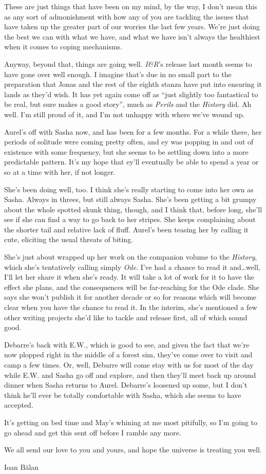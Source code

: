 These are just things that have been on my mind, by the way, I don't mean this as any sort of admonishment with how any of you are tackling the issues that have taken up the greater part of our worries the last few years. We're just doing the best we can with what we have, and what we have isn't always the healthiest when it comes to coping mechanisms.

Anyway, beyond that, things are going well. \emph{I\&R}'s release last month seems to have gone over well enough. I imagine that's due in no small part to the preparation that Jonas and the rest of the eighth stanza have put into ensuring it lands as they'd wish. It has yet again come off as ``just slightly too fantastical to be real, but sure makes a good story'', much as \emph{Perils} and the \emph{History} did. Ah well. I'm still proud of it, and I'm not unhappy with where we've wound up.

Aurel's off with Sasha now, and has been for a few months. For a while there, her periods of solitude were coming pretty often, and ey was popping in and out of existence with some frequency, but she seems to be settling down into a more predictable pattern. It's my hope that ey'll eventually be able to spend a year or so at a time with her, if not longer.

She's been doing well, too. I think she's really starting to come into her own as Sasha. Always in threes, but still always Sasha. She's been getting a bit grumpy about the whole spotted skunk thing, though, and I think that, before long, she'll see if she can find a way to go back to her stripes. She keeps complaining about the shorter tail and relative lack of fluff. Aurel's been teasing her by calling it cute, eliciting the usual threats of biting.

She's just about wrapped up her work on the companion volume to the \emph{History}, which she's tentatively calling simply \emph{Ode}. I've had a chance to read it and\ldots{}well, I'll let her share it when she's ready. It will take a lot of work for it to have the effect she plans, and the consequences will be far-reaching for the Ode clade. She says she won't publish it for another decade or so for reasons which will become clear when you have the chance to read it. In the interim, she's mentioned a few other writing projects she'd like to tackle and release first, all of which sound good.

Debarre's back with E.W., which is good to see, and given the fact that we're now plopped right in the middle of a forest sim, they've come over to visit and camp a few times. Or, well, Debarre will come stay with us for most of the day while E.W. and Sasha go off and explore, and then they'll meet back up around dinner when Sasha returns to Aurel. Debarre's loosened up some, but I don't think he'll ever be totally comfortable with Sasha, which she seems to have accepted.

It's getting on bed time and May's whining at me most pitifully, so I'm going to go ahead and get this sent off before I ramble any more.

We all send our love to you and yours, and hope the universe is treating you well.

Ioan Bălan
